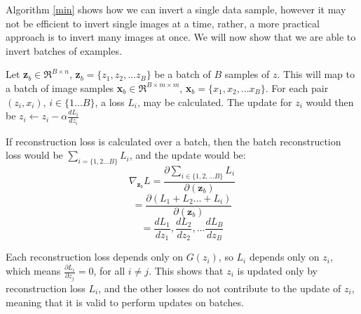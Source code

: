 \documentclass[journal]{IEEEtran}
\begin{document}
Algorithm \ref{min} shows how we can invert a single data sample, however it may not be efficient to invert single images at a time, rather, a more practical approach is to invert many images at once. We will now show that we are able to invert batches of examples.

Let \textbf{z}$_b \in \Re^{B \times n}$, \textbf{z}$_b=\{z_1, z_2, ... z_B\}$ be a batch of $B$ samples of $z$. This will map to a batch of image samples \textbf{x}$_b \in \Re^{B \times m \times m}$, \textbf{x}$_b=\{x_1, x_2, ... x_B\}$. For each pair $(z_i, x_i)$, $i \in \{1...B\}$, a loss $L_i$, may be calculated. The update for $z_i$ would then be $z_i \gets z_i - \alpha \frac{d L_i}{d z_i}$ 

If reconstruction loss is calculated over a batch, then the batch reconstruction loss would be $\sum_{i=\{1,2...B\}} L_i$, and the update would be: 
\begin{equation}
    \nabla_{\textbf{z}_b} L = \frac{\partial \sum_{i \in \{1,2,...B\}} L_i}{\partial (\textbf{z}_b)}
\end{equation}
\begin{equation}
    =\frac{\partial(L_1+L_2...+L_i)}{\partial(\textbf{z}_b)}
\end{equation}
\begin{equation}
    = \frac{dL_1}{dz_1}, \frac{dL_2}{dz_2}, ... \frac{dL_B}{dz_B}
\end{equation}

Each reconstruction loss depends only on $G(z_i)$, so $L_i$ depends only on $z_i$, which means $\frac{\partial L_i}{\partial z_j}=0$, for all $i\not=j$. This shows that $z_i$ is updated only by reconstruction loss $L_i$, and the other losses do not contribute to the update of $z_i$, meaning that it is valid to perform updates on batches.

\end{document}

